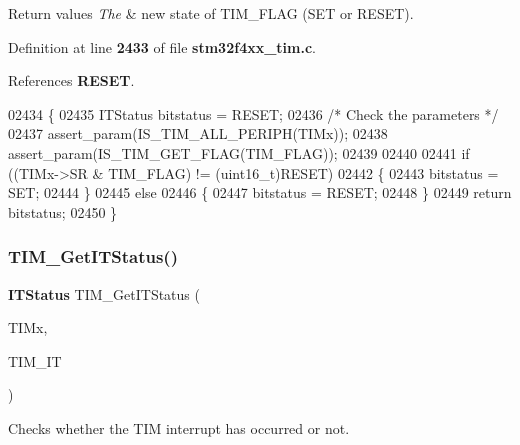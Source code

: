\begin{DoxyRetVals}{Return values}
{\em The} & new state of T\+I\+M\+\_\+\+F\+L\+AG (S\+ET or R\+E\+S\+ET). \\
\hline
\end{DoxyRetVals}


Definition at line \textbf{ 2433} of file \textbf{ stm32f4xx\+\_\+tim.\+c}.



References \textbf{ R\+E\+S\+ET}.


\begin{DoxyCode}
02434 \{ 
02435   ITStatus bitstatus = RESET;  
02436   \textcolor{comment}{/* Check the parameters */}
02437   assert_param(IS_TIM_ALL_PERIPH(TIMx));
02438   assert_param(IS_TIM_GET_FLAG(TIM\_FLAG));
02439 
02440   
02441   \textcolor{keywordflow}{if} ((TIMx->SR & TIM\_FLAG) != (uint16\_t)RESET)
02442   \{
02443     bitstatus = SET;
02444   \}
02445   \textcolor{keywordflow}{else}
02446   \{
02447     bitstatus = RESET;
02448   \}
02449   \textcolor{keywordflow}{return} bitstatus;
02450 \}
\end{DoxyCode}
\mbox{\label{group__TIM__Group5_ga0827a0b411707304f76d33050727c24d}} 
\subsubsection{T\+I\+M\+\_\+\+Get\+I\+T\+Status()}
{\footnotesize\ttfamily \textbf{ I\+T\+Status} T\+I\+M\+\_\+\+Get\+I\+T\+Status (\begin{DoxyParamCaption}\item[{\textbf{ T\+I\+M\+\_\+\+Type\+Def} $\ast$}]{T\+I\+Mx,  }\item[{uint16\+\_\+t}]{T\+I\+M\+\_\+\+IT }\end{DoxyParamCaption})}



Checks whether the T\+IM interrupt has occurred or not. 


